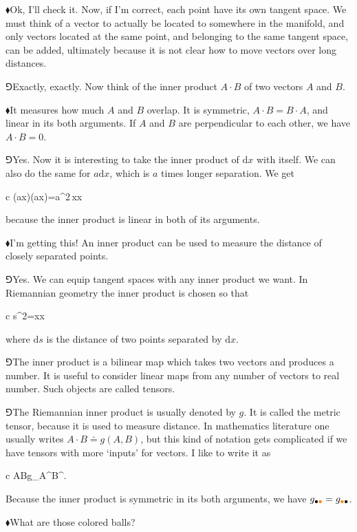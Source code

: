 \documentclass[10pt,oneside%
]{memoir}
\newenvironment{eqna}{\begin{IEEEeqnarray*}{c}}{\end{IEEEeqnarray*}\ignorespacesafterend}
\newcommand{\dd}{\mathrm{d}}
\newcommand{\coa}{{\color{black}\bullet}}
\newcommand{\cob}{{\color{oranssi}\bullet}}
\newcommand{\hea}{\(\blacklozenge\)\;}
\newcommand{\heb}{\(\Game\)\;}
\begin{document}
\hea Ok, I'll check it. Now, if I'm correct, each point have its own tangent space. We must think of a vector to actually be located to somewhere in the manifold, and only vectors located at the same point, and belonging to the same tangent space, can be added, ultimately because it is not clear how to move vectors over long distances.

\heb Exactly, exactly. Now think of the inner product \(A\cdot B\) of two vectors \(A\) and \(B\).

\hea It measures how much \(A\) and \(B\) overlap. It is symmetric, \(A\cdot B=B\cdot A\), and linear in its both arguments. If \(A\) and \(B\) are perpendicular to each other, we have \(A\cdot B=0\).

\heb Yes. Now it is interesting to take the inner product of \(\dd x\) with itself. We can also do the same for \(a\dd x\), which is \(a\) times longer separation. We get
\begin{eqna}
    (a\dd x)\cdot(a\dd x)=a^2\,\dd x\cdot\dd x
\end{eqna}
because the inner product is linear in both of its arguments.

\hea I'm getting this! An inner product can be used to measure the distance of closely separated points.

\heb Yes. We can equip tangent spaces with any inner product we want. In Riemannian geometry the inner product is chosen so that
\begin{eqna}
    \dd s^2=\dd x\cdot\dd x
\end{eqna}
where \(\dd s\) is the distance of two points separated by \(\dd x\).

\heb The inner product is a bilinear map which takes two vectors and produces a number. It is useful to consider linear maps from any number of vectors to real number. Such objects are called tensors.

\heb The Riemannian inner product is usually denoted by \(g\). It is called the metric tensor, because it is used to measure distance. In mathematics literature one usually writes \(A\cdot B\doteq g(A,B)\), but this kind of notation gets complicated if we have tensors with more `inputs' for vectors. I like to write it as
\begin{eqna}
    A\cdot B\doteq g_{\coa\cob}A^\coa B^\cob.
\end{eqna}
Because the inner product is symmetric in its both arguments, we have \(g_{\coa\cob}=g_{\cob\coa}\).

\hea What are those colored balls?
\end{document}
